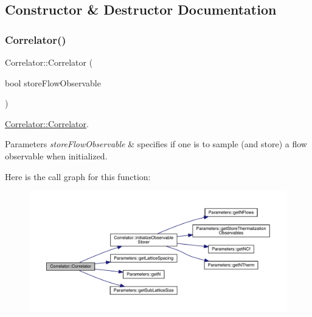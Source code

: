 \subsection{Constructor \& Destructor Documentation}
\mbox{\label{class_correlator_aff48ef3bf789e9c6231eacc21cd9ed9a}} 
\subsubsection{\texorpdfstring{Correlator()}{Correlator()}\hspace{0.1cm}{\footnotesize\ttfamily [1/2]}}
{\footnotesize\ttfamily Correlator\+::\+Correlator (\begin{DoxyParamCaption}\item[{bool}]{store\+Flow\+Observable }\end{DoxyParamCaption})}



\mbox{\hyperlink{class_correlator_aff48ef3bf789e9c6231eacc21cd9ed9a}{Correlator\+::\+Correlator}}. 


\begin{DoxyParams}{Parameters}
{\em store\+Flow\+Observable} & specifies if one is to sample (and store) a flow observable when initialized. \\
\hline
\end{DoxyParams}
Here is the call graph for this function\+:\nopagebreak
\begin{figure}[H]
\begin{center}
\leavevmode
\includegraphics[width=350pt]{class_correlator_aff48ef3bf789e9c6231eacc21cd9ed9a_cgraph}
\end{center}
\end{figure}
\mbox{\label{class_correlator_a6114955836dba0b4b61138490cd3fe91}} 
